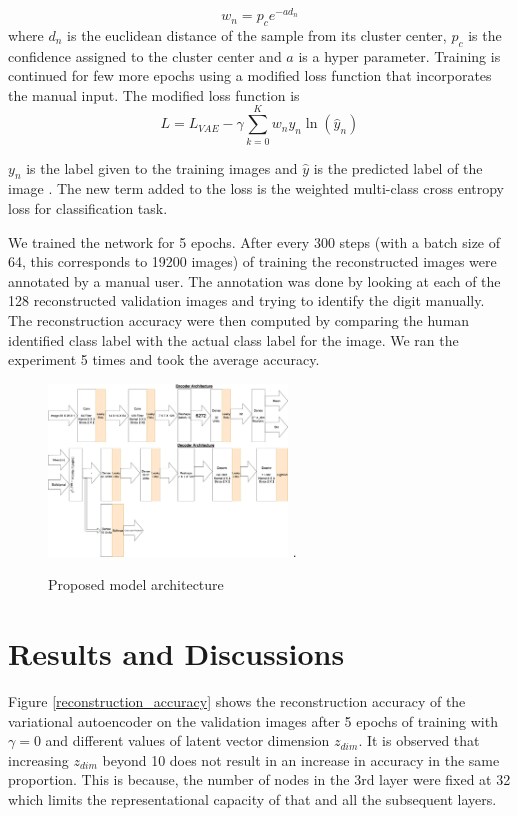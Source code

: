 \documentclass[journal]{IEEEtran}
\begin{document}
\begin{equation}
w_n = p_ce^{-a d_n}
\end{equation}
where $d_n$ is the euclidean distance of the sample from its cluster center, $p_c$  is the confidence assigned to the cluster center and $a$ is a hyper parameter.
Training is continued for few more epochs using a modified loss function that incorporates the manual input. The modified loss function is
\begin{equation}
L = L_{VAE}  - \gamma \sum_{k=0}^{K}w_{n}y_{n}\ln(\hat{y}_{n})
\end{equation}

$y_n$ is the label given to the training images and $\hat{y}$ is the predicted label of the image . The new term added to the loss is the weighted multi-class cross entropy loss for classification task. 

We trained the network for 5 epochs. After every 300 steps (with a batch size of 64, this corresponds to 19200 images) of training the reconstructed images were annotated by a manual user. The annotation was done by looking at each of the 128  reconstructed validation images and trying to identify the digit manually. The reconstruction accuracy were then computed by comparing the human identified class label with the actual class label for the image. We ran the experiment 5 times and took the average accuracy.


\begin{figure}[!t]
\centering
\includegraphics[width=2.5in]{vae_model_architecture_classification.jpg}
\DeclareGraphicsExtensions.
\caption{Proposed model architecture}
\label{vae_architecture}
\end{figure}


\section{Results and Discussions} \label{results}
Figure \ref{reconstruction_accuracy} shows  the reconstruction accuracy of the variational autoencoder on the validation images after 5 epochs of training with $\gamma = 0$  and different values of latent vector dimension $z_{dim}$. It is observed that increasing $z_{dim}$ beyond 10 does not result in an increase in accuracy in the same proportion. This is because, the number of nodes in the 3rd layer were fixed at 32 which limits the representational capacity of that and all the subsequent layers.
\end{document}
